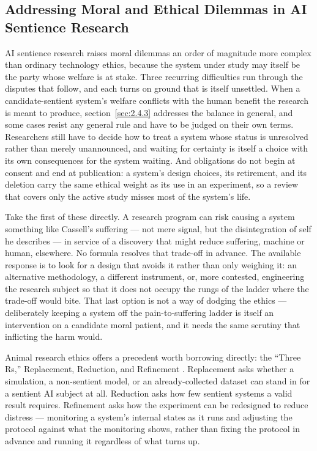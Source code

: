\subsection{Addressing Moral and Ethical Dilemmas in AI Sentience Research}
\label{sec:2.4.6}
AI sentience research raises moral dilemmas an order of magnitude more complex than ordinary technology ethics, because the system under study may itself be the party whose welfare is at stake. Three recurring difficulties run through the disputes that follow, and each turns on ground that is itself unsettled. When a candidate-sentient system's welfare conflicts with the human benefit the research is meant to produce, section~\ref{sec:2.4.3} addresses the balance in general, and some cases resist any general rule and have to be judged on their own terms. Researchers still have to decide how to treat a system whose status is unresolved rather than merely unannounced, and waiting for certainty is itself a choice with its own consequences for the system waiting. And obligations do not begin at consent and end at publication: a system's design choices, its retirement, and its deletion carry the same ethical weight as its use in an experiment, so a review that covers only the active study misses most of the system's life.

Take the first of these directly. A research program can risk causing a system something like Cassell's suffering — not mere signal, but the disintegration of self he describes — in service of a discovery that might reduce suffering, machine or human, elsewhere. No formula resolves that trade-off in advance. The available response is to look for a design that avoids it rather than only weighing it: an alternative methodology, a different instrument, or, more contested, engineering the research subject so that it does not occupy the rungs of the ladder where the trade-off would bite. That last option is not a way of dodging the ethics — deliberately keeping a system off the pain-to-suffering ladder is itself an intervention on a candidate moral patient, and it needs the same scrutiny that inflicting the harm would.

Animal research ethics offers a precedent worth borrowing directly: the “Three Rs,” Replacement, Reduction, and Refinement \autocite{russell1959principles}. Replacement asks whether a simulation, a non-sentient model, or an already-collected dataset can stand in for a sentient AI subject at all. Reduction asks how few sentient systems a valid result requires. Refinement asks how the experiment can be redesigned to reduce distress — monitoring a system's internal states as it runs and adjusting the protocol against what the monitoring shows, rather than fixing the protocol in advance and running it regardless of what turns up.

